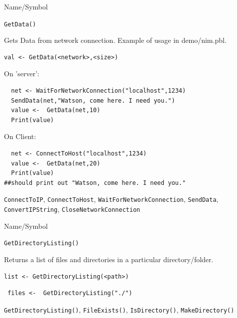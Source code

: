 \begin{desc}{Name/Symbol}
\item[Name/Symbol]	\verb+GetData()+

\item[Description]	Gets Data from network connection.  Example of
  usage in demo/nim.pbl.

\item[Usage]
\begin{verbatim}
val <- GetData(<network>,<size>)
\end{verbatim}

\item[Example]	

On 'server':
\begin{verbatim}
  net <- WaitForNetworkConnection("localhost",1234)
  SendData(net,"Watson, come here. I need you.")
  value <-  GetData(net,10)
  Print(value)

\end{verbatim}
On Client:
\begin{verbatim}
  net <- ConnectToHost("localhost",1234)
  value <-  GetData(net,20)
  Print(value)
##should print out "Watson, come here. I need you."
\end{verbatim}
\item[See Also]
  \verb+ConnectToIP+, \verb+ConnectToHost+, \verb+WaitForNetworkConnection+,
   \verb+SendData+, \verb+ConvertIPString+, \verb+CloseNetworkConnection+
\end{desc}




\begin{desc}{Name/Symbol}
\item[Name/Symbol]	\verb+GetDirectoryListing()+

\item[Description]	Returns a list of files and directories in a particular directory/folder.
\item[Usage]		
\begin{verbatim}
list <- GetDirectoryListing(<path>)
\end{verbatim}

\item[Example]	
\begin{verbatim}
 files <-  GetDirectoryListing("./")
\end{verbatim}

\item[See Also]\verb+GetDirectoryListing()+, \verb+FileExists()+,       \verb+IsDirectory()+,        
   \verb+MakeDirectory()+      

\end{desc}


